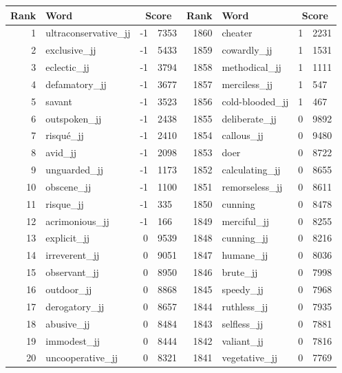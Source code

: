 \begin{table}[tbp]
    \begin{tabular}{| rlr@{.}l | rlr@{.}l |}
    \hline
    \textbf{Rank} & \textbf{Word} & \multicolumn{2}{c|}{\textbf{Score}} & \textbf{Rank} & \textbf{Word} & \multicolumn{2}{c|}{\textbf{Score}} \\
    \hline
    1 & ultraconservative\_jj & -1 & 7353    &    1860 & cheater & 1 & 2231 \\
    2 & exclusive\_jj & -1 & 5433    &    1859 & cowardly\_jj & 1 & 1531 \\
    3 & eclectic\_jj & -1 & 3794    &    1858 & methodical\_jj & 1 & 1111 \\
    4 & defamatory\_jj & -1 & 3677    &    1857 & merciless\_jj & 1 & 547 \\
    5 & savant & -1 & 3523    &    1856 & cold-blooded\_jj & 1 & 467 \\
    6 & outspoken\_jj & -1 & 2438    &    1855 & deliberate\_jj & 0 & 9892 \\
    7 & risqué\_jj & -1 & 2410    &    1854 & callous\_jj & 0 & 9480 \\
    8 & avid\_jj & -1 & 2098    &    1853 & doer & 0 & 8722 \\
    9 & unguarded\_jj & -1 & 1173    &    1852 & calculating\_jj & 0 & 8655 \\
    10 & obscene\_jj & -1 & 1100    &    1851 & remorseless\_jj & 0 & 8611 \\
    11 & risque\_jj & -1 & 335    &    1850 & cunning & 0 & 8478 \\
    12 & acrimonious\_jj & -1 & 166    &    1849 & merciful\_jj & 0 & 8255 \\
    13 & explicit\_jj & 0 & 9539    &    1848 & cunning\_jj & 0 & 8216 \\
    14 & irreverent\_jj & 0 & 9051    &    1847 & humane\_jj & 0 & 8036 \\
    15 & observant\_jj & 0 & 8950    &    1846 & brute\_jj & 0 & 7998 \\
    16 & outdoor\_jj & 0 & 8868    &    1845 & speedy\_jj & 0 & 7968 \\
    17 & derogatory\_jj & 0 & 8657    &    1844 & ruthless\_jj & 0 & 7935 \\
    18 & abusive\_jj & 0 & 8484    &    1843 & selfless\_jj & 0 & 7881 \\
    19 & immodest\_jj & 0 & 8444    &    1842 & valiant\_jj & 0 & 7816 \\
    20 & uncooperative\_jj & 0 & 8321    &    1841 & vegetative\_jj & 0 & 7769 \\

\end{tabular}
\end{table}
